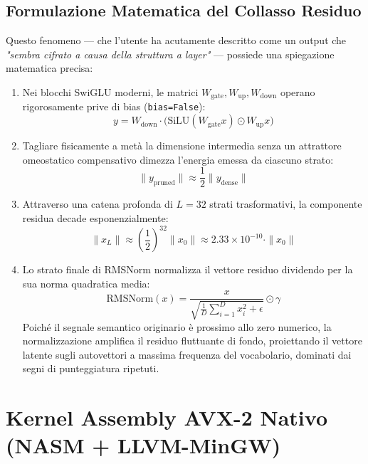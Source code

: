 \documentclass[10pt,a4paper]{article}
\theoremstyle{definition}
\begin{document}
\subsection{Formulazione Matematica del Collasso Residuo}
Questo fenomeno --- che l'utente ha acutamente descritto come un output che \textit{"sembra cifrato a causa della struttura a layer"} --- possiede una spiegazione matematica precisa:
\begin{enumerate}
    \item Nei blocchi SwiGLU moderni, le matrici $W_{\text{gate}}, W_{\text{up}}, W_{\text{down}}$ operano rigorosamente prive di bias (\texttt{bias=False}):
    \begin{equation}
    y = W_{\text{down}} \cdot \Big( \text{SiLU}(W_{\text{gate}} x) \odot W_{\text{up}} x \Big)
    \end{equation}
    \item Tagliare fisicamente a metà la dimensione intermedia senza un attrattore omeostatico compensativo dimezza l'energia emessa da ciascuno strato:
    \begin{equation}
    \|y_{\text{pruned}}\| \approx \frac{1}{2} \|y_{\text{dense}}\|
    \end{equation}
    \item Attraverso una catena profonda di $L = 32$ strati trasformativi, la componente residua decade esponenzialmente:
    \begin{equation}
    \|x_L\| \approx \left(\frac{1}{2}\right)^{32} \|x_0\| \approx 2.33 \times 10^{-10} \cdot \|x_0\|
    \end{equation}
    \item Lo strato finale di RMSNorm normalizza il vettore residuo dividendo per la sua norma quadratica media:
    \begin{equation}
    \text{RMSNorm}(x) = \frac{x}{\sqrt{\frac{1}{D} \sum_{i=1}^D x_i^2 + \epsilon}} \odot \gamma
    \end{equation}
    Poiché il segnale semantico originario è prossimo allo zero numerico, la normalizzazione amplifica il residuo fluttuante di fondo, proiettando il vettore latente sugli autovettori a massima frequenza del vocabolario, dominati dai segni di punteggiatura ripetuti.
\end{enumerate}

\bigskip

\section{Kernel Assembly AVX-2 Nativo (NASM + LLVM-MinGW)}
\end{document}
